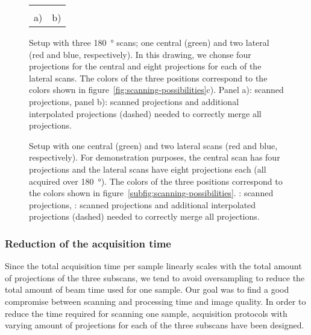 \ifiucr
	\begin{figure}%
		\caption{Setup with three \SI{180}{\degree} scans; one central (green) and two lateral (red and blue, respectively). In this drawing, we chonse four projections for the central and eight projections for each of the lateral scans. The colors of the three positions correspond to the colors shown in figure~\ref{fig:scanning-possibilities}c). Panel a): scanned projections, panel b): scanned projections and additional interpolated projections (dashed) needed to correctly merge all projections.}%
		\begin{tabular}{cc}%
		&%
		\\%
		a) & b)\\%
		\end{tabular}%
		\label{fig:projections}%
	\end{figure}%
\else
	\begin{figure*}[htp]
		\centering
		\subfloat[]{%
			\label{subfig:ProjectionSetup}%
			}%
		\subfloat[]{%
			\label{subfig:ProjectionSetupInterpolate}%
			}%
		\caption{Setup with one central (green) and two lateral scans (red and blue, respectively). For demonstration purposes, the central scan has four projections and the lateral scans have eight projections each (all acquired over \SI{180}{\degree}). The colors of the three positions correspond to the colors shown in figure~\ref{subfig:scanning-possibilities}. : scanned projections, : scanned projections and additional interpolated projections (dashed) needed to correctly merge all projections.}
		\label{fig:projections}
	\end{figure*}
\fi

\subsubsection{Reduction of the acquisition time}%
Since the total acquisition time per sample linearly scales with the total amount of projections of the three subscans, we tend to avoid oversampling to reduce the total amount of beam time used for one sample. Our goal was to find a good compromise between scanning and processing time and image quality. In order to reduce the time required for scanning one sample, acquisition protocols with varying amount of projections for each of the three subscans have been designed.

